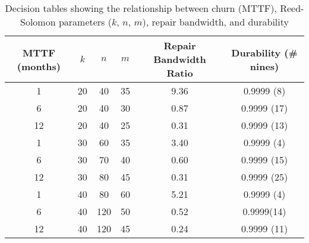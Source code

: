 \begin{table}[!htpb]\centering

\begin{tabular}{| c | c c c | c | c|}\hline
MTTF (months) &$k$& $n$ & $m$ &Repair Bandwidth Ratio&Durability (\# nines) \\\hline
1 &20& 40 & 35 & 9.36 & 0.9999 (8) \\
6 &20& 40 & 30 & 0.87 & 0.9999 (17) \\
12 &20& 40 & 25 & 0.31 & 0.9999 (13)\\\hline

1 &30& 60 & 35 & 3.40 &0.9999 (4)\\
6 &30& 70 & 40 & 0.60 &0.9999 (15)\\
12 &30& 80 & 45 & 0.31 &0.9999 (25) \\\hline

1 &40& 80 & 60 & 5.21 &0.9999 (4)\\
6 &40&120&50 & 0.52 &0.9999(14)\\
12 &40&120&45 & 0.24 &0.9999 (11)\\\hline

\end{tabular}
\caption{Decision tables showing the relationship between churn (MTTF),
  Reed-Solomon parameters ($k$, $n$, $m$), repair bandwidth, and durability}
\label{rs:decision-tables}
\end{table}
